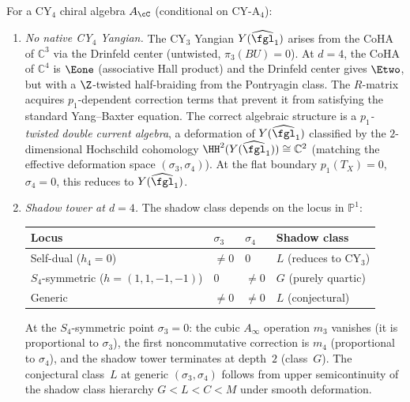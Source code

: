 \begin{conjecture}[The \texorpdfstring{$d = 4$}{d = 4} \texorpdfstring{$\En$}{E-n} stabilisation: \texorpdfstring{$p_1$}{p-1}-twisted algebras and shadow tower]
\label{conj:cy4-en-stabilisation}
\ClaimStatusConjectured
For a CY$_4$ chiral algebra $A_\cC$ (conditional on CY-A$_4$):
\begin{enumerate}[label=\textup{(\roman*)}]
 \item \emph{No native CY$_4$ Yangian.} The CY$_3$ Yangian $Y(\widehat{\fgl}_1)$ arises from the CoHA of $\mathbb{C}^3$ via the Drinfeld center (untwisted, $\pi_3(BU) = 0$). At $d = 4$, the CoHA of $\mathbb{C}^4$ is $\Eone$ (associative Hall product) and the Drinfeld center gives $\Etwo$, but with a $\Z$-twisted half-braiding from the Pontryagin class. The $R$-matrix acquires \(p_1\)-dependent correction terms that prevent it from satisfying the standard Yang--Baxter equation. The correct algebraic structure is a \emph{$p_1$-twisted double current algebra}, a deformation of $Y(\widehat{\fgl}_1)$ classified by the $2$-dimensional Hochschild cohomology $\HH^2(Y(\widehat{\fgl}_1)) \cong \mathbb{C}^2$ (matching the effective deformation space $(\sigma_3, \sigma_4)$). At the flat boundary \(p_1(T_X)=0\), \(\sigma_4=0\), this reduces to \(Y(\widehat{\fgl}_1)\).

 \item \emph{Shadow tower at $d = 4$.} The shadow class depends on the locus in $\mathbb{P}^1$:
 \begin{center}
 \small
 \renewcommand{\arraystretch}{1.15}
 \begin{tabular}{llll}
 \toprule
 Locus & $\sigma_3$ & $\sigma_4$ & Shadow class \\
 \midrule
 Self-dual ($h_4 = 0$) & $\neq 0$ & $0$ & $L$ (reduces to CY$_3$) \\
 $S_4$-symmetric ($h = (1,1,-1,-1)$) & $0$ & $\neq 0$ & $G$ (purely quartic) \\
 Generic & $\neq 0$ & $\neq 0$ & $L$ (conjectural) \\
 \bottomrule
 \end{tabular}
 \end{center}
 At the $S_4$-symmetric point $\sigma_3 = 0$: the cubic $A_\infty$ operation $m_3$ vanishes (it is proportional to $\sigma_3$), the first noncommutative correction is $m_4$ (proportional to $\sigma_4$), and the shadow tower terminates at depth~$2$ (class~$G$). The conjectural class~$L$ at generic $(\sigma_3, \sigma_4)$ follows from upper semicontinuity of the shadow class hierarchy $G < L < C < M$ under smooth deformation.


\end{enumerate}
\end{conjecture}
